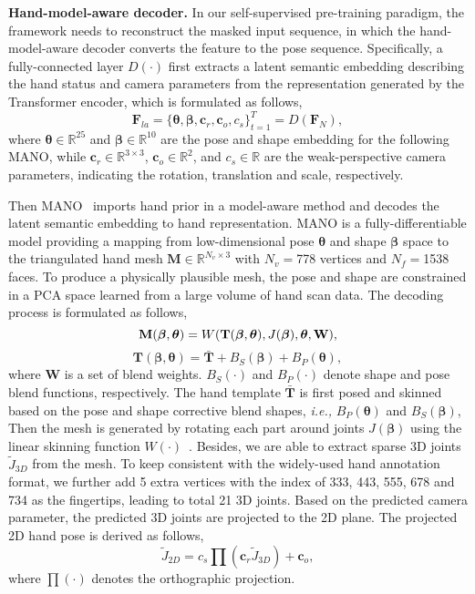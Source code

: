 \documentclass[10pt,twocolumn,letterpaper]{article}
\begin{document}
\noindent \textbf{Hand-model-aware decoder.}
In our self-supervised pre-training paradigm, the framework needs to reconstruct the masked input sequence, in which the hand-model-aware decoder converts the feature to the pose sequence.
Specifically, a fully-connected layer $D(\cdot)$ first extracts a latent semantic embedding describing the hand status and camera parameters from the representation generated by the Transformer encoder, which is formulated as follows,
\begin{equation}
\label{equ:cnn_tcn}
  \mathbf{F}_{la} = \{\bm{\theta}, \bm{\beta}, \mathbf{c}_r, \mathbf{c}_o, c_s\}_{t=1}^T = D(\mathbf{F}_N),
\end{equation} 
where $\bm{\theta} \in \mathbb{R}^{25}$ and $\bm{\beta} \in \mathbb{R}^{10}$ are the pose and shape embedding for the following MANO, while $\mathbf{c}_r \in \mathbb{R}^{3\times3}$, $\mathbf{c}_o \in \mathbb{R}^{2}$, and $c_s \in \mathbb{R}$ are the weak-perspective camera parameters, indicating the rotation, translation and scale, respectively.

Then MANO~\cite{romero2017embodied} imports hand prior in a model-aware method and decodes the latent semantic embedding to hand representation.
MANO is a fully-differentiable model providing a mapping from low-dimensional pose $\bm{\theta}$ and shape $\bm{\beta}$ space to the triangulated hand mesh $\mathbf{M} \in \mathbb{R}^{N_v \times 3}$ with $N_v=$778 vertices and $N_f=$1538 faces.
To produce a physically plausible mesh, the pose and shape are constrained in a PCA space learned from a large volume of hand scan data.
The decoding process is formulated as follows,
\begin{equation}
\label{equ:mano}
  \mathbf{M}(\bm{\beta}, \bm{\theta}) = W(\mathbf{T}(\bm{\beta}, \bm{\theta}), J(\bm{\beta}), \bm{\theta}, \mathbf{W}),
  \vspace{-0.5cm}
\end{equation}
\begin{equation}
\label{equ:mano2}
  \mathbf{T}(\bm{\beta}, \bm{\theta}) = \bar{\mathbf{T}} + B_S(\bm{\beta}) + B_P(\bm{\theta}),
\end{equation}
where $\mathbf{W}$ is a set of blend weights. 
$B_S(\cdot)$ and $B_P(\cdot)$ denote shape and pose blend functions, respectively. 
The hand template $\bar{\mathbf{T}}$ is first posed and skinned based on the pose and shape corrective blend shapes, \emph{i.e.,} $B_P(\bm{\theta})$ and $B_S(\bm{\beta})$,
Then the mesh is generated by rotating each part around joints $J(\bm{\beta})$ using the linear skinning function $W(\cdot)$~\cite{kavan2005spherical}.
Besides, we are able to extract sparse 3D joints $\widetilde{J}_{3D}$ from the mesh.
To keep consistent with the widely-used hand annotation format, we further add 5 extra vertices with the index of 333, 443, 555, 678 and 734 as the fingertips, leading to total 21 3D joints.
Based on the predicted camera parameter, the predicted 3D joints are projected to the 2D plane.
The projected 2D hand pose is derived as follows,
\begin{equation}
\label{equ:weak}
  \widetilde{J}_{2D} = c_s\prod{({\mathbf{c}_{r}}{{\widetilde{J}}_{3D}})}+\mathbf{c}_o,
\end{equation} 
where $\prod(\cdot)$ denotes the orthographic projection.
\end{document}
